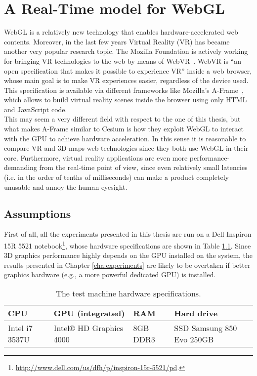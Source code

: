 ﻿%
\chapter{A Real-Time model for WebGL} \label{cha:rt_model}

WebGL is a relatively new technology that enables hardware-accelerated web
contents. Moreover, in the last few years Virtual Reality (VR) has became
another very popular research topic. The Mozilla Foundation is actively working
for bringing VR technologies to the web by means of WebVR~\cite{mozvr}. WebVR is
``an open specification that makes it possible to experience VR'' inside a web
browser, whose main goal is to make VR experiences easier, regardless of the
device used. This specification is available
via different frameworks like Mozilla's A-Frame~\cite{aframe}, which allows
to build virtual reality scenes inside the browser using only HTML and JavaScript
code.\\
This may seem a very different field with respect to the one of this
thesis, but what makes A-Frame similar to Cesium is how they exploit WebGL to
interact with the GPU to achieve hardware acceleration. In this sense it is
reasonable to compare VR and 3D-maps web technologies since they both use WebGL
in their core. Furthermore, virtual reality applications are even more
performance-demanding from the real-time point of view, since even relatively
small latencies (i.e. in the order of tenths of milliseconds) can make a product
completely unusable and annoy the human eyesight.


\section{Assumptions} \label{sec:assumptions}
First of all, all the experiments presented in this thesis are run on a Dell
Inspiron 15R 5521 notebook\footnote{\url{http://www.dell.com/us/dfh/p/inspiron-15r-5521/pd}.},
whose hardware specifications are shown in Table \ref{tab:notebook_specs}.
Since 3D graphics performance highly depends on the GPU installed on the system,
the results presented in Chapter \ref{cha:experiments} are likely to be overtaken
if better graphics hardware (e.g., a more powerful dedicated GPU) is installed.
\begin{table}[!htb]
    \centering
    \caption{The test machine hardware specifications.}
    \label{tab:notebook_specs}
    \begin{tabular}{|l|l|l|l|}
    \hline
    \multicolumn{1}{|l|}{\textbf{CPU}} & \multicolumn{1}{l|}{\textbf{GPU (integrated)}} & \multicolumn{1}{l|}{\textbf{RAM}} & \multicolumn{1}{l|}{\textbf{Hard drive}} \\ \hline
    Intel i7 3537U & Intel® HD Graphics 4000 & 8GB DDR3 & SSD Samsung 850 Evo 250GB \\ \hline
    \end{tabular}
\end{table}

